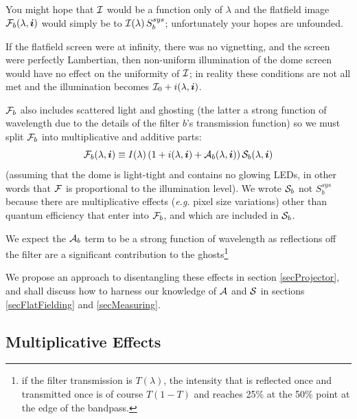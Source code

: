 \documentclass[12pt]{article}
\newcommand{\eg}{\textit{e.g.}\xspace}
\newcommand{\ib}{{\boldsymbol i}}
\newcommand{\Flat}{{\cal F}}
\newcommand{\screen}{{\cal I}}
\newcommand{\additive}{{\cal A}}
\newcommand{\qe}{{\cal S}}
\begin{document}
You might hope that $\screen$ would be a function only of $\lambda$ and the flatfield image $\Flat_b(\lambda,
\ib)$ would simply be to $\screen(\lambda)\,S_b^{sys}$; unfortunately your hopes are unfounded.

If the flatfield screen were at infinity, there was no vignetting, and the screen were perfectly Lambertian,
then non-uniform illumination of the dome screen would have no effect on the uniformity of $\screen$; in
reality these conditions are not all met and the illumination becomes $\screen_0 + i(\lambda, \ib)$.

$\Flat_b$ also includes
scattered light and ghosting (the latter a strong function of wavelength due to the details of the filter
$b$'s transmission function) so we must split $\Flat_b$ into multiplicative and additive parts:
$$
\Flat_b(\lambda, \ib) \equiv I(\lambda) \left(
                                              1 + i(\lambda, \ib) + \additive_b(\lambda, \ib)
                                        \right) \qe_b(\lambda, \ib)
$$
(assuming that the dome is light-tight and contains no glowing LEDs, in other words that $\Flat$ is
proportional to the illumination level).  We wrote $\qe_b$ not $S_b^{sys}$ because there are multiplicative
effects (\eg pixel size variations) other than quantum efficiency that enter into $\Flat_b$, and which
are included in $\qe_b$.

We expect the $\additive_b$ term to be a strong function of wavelength as reflections off the filter
are a significant contribution to the ghosts\footnote{
  if the filter transmission is $T(\lambda)$, the intensity that is reflected once and transmitted once
  is of course $T(1-T)$ and reaches 25\% at the 50\% point at the edge of the bandpass.
  }

We propose an approach to disentangling these effects in section \ref{secProjector}, and shall discuss how to
harness our knowledge of $\additive$ and $\qe$ in sections \ref{secFlatFielding} and \ref{secMeasuring}.

\subsection{Multiplicative Effects}
\end{document}
